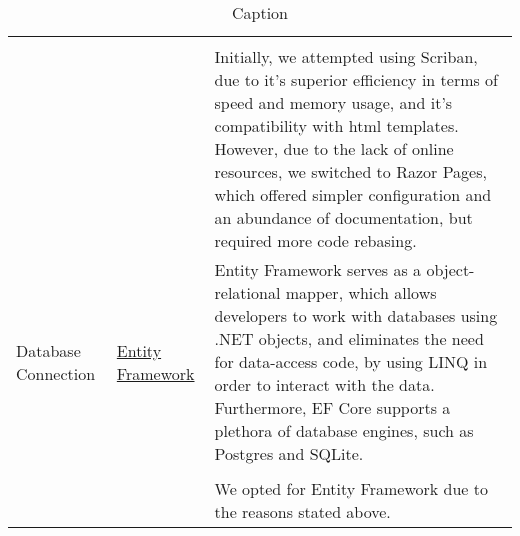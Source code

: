 \begin{table}[H]
\begin{tabular}{|p{}|p{} | p{}|}
         && \\
         && Initially, we attempted using Scriban, due to it's superior efficiency in terms of speed and memory usage, and it's compatibility with html templates. However, due to the lack of online resources, we switched to Razor Pages, which offered simpler configuration and an abundance of documentation, but required more code rebasing.\\
         \hline
         Database Connection & \href{https://learn.microsoft.com/en-us/ef/core/}{Entity Framework} & Entity Framework serves as a object-relational mapper, which allows developers to work with databases using .NET objects, and eliminates the need for data-access code, by using LINQ in order to interact with the data. Furthermore, EF Core supports a plethora of database engines, such as Postgres and SQLite.\\
         &&\\
         && We opted for Entity Framework due to the reasons stated above.\\
         \hline
    \end{tabular}
    \caption{Caption}
    \label{tab:tools1}
\end{table}